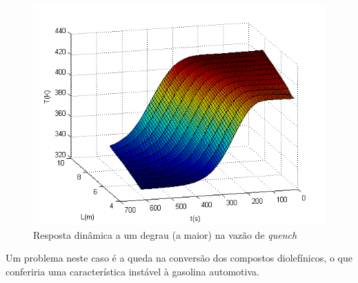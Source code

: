 \begin{figure}[htb]
\centering
\includegraphics[scale=0.8]{images/Chap4/QuenchF30790.png}
\caption{Resposta dinâmica a um degrau (a maior) na vazão de \emph{quench}}
\label{fig:QuenchF30790}
\end{figure}

Um problema neste caso é a queda na conversão dos compostos diolefínicos, o
que conferiria uma característica instável à gasolina automotiva.









